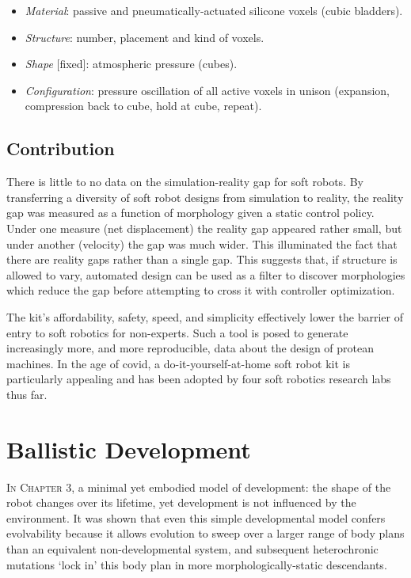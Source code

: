 \begin{itemize}
    \item \textit{Material}: passive and pneumatically-actuated silicone voxels (cubic bladders).
    \item \textit{Structure}: number, placement and kind of voxels.
    \item \textit{Shape} [fixed]: atmospheric pressure (cubes).
    \item \textit{Configuration}: pressure oscillation of all active voxels in unison (expansion, compression back to cube, hold at cube, repeat).
\end{itemize}



\subsection{Contribution}



There is little to no data on the simulation-reality gap for soft robots.
By transferring a diversity of soft robot designs from simulation to reality, the reality gap was measured as a function of morphology given a static control policy.
Under one measure (net displacement) the reality gap appeared rather small, but under another (velocity) the gap was much wider.
This illuminated the fact that there are reality gaps rather than a single gap.
This suggests that, if structure is allowed to vary, automated design can be used as a filter to discover morphologies which reduce the gap before attempting to cross it with controller optimization.

The kit's affordability, safety, speed, and simplicity effectively lower the barrier of entry to soft robotics for non-experts.
Such a tool is posed to generate increasingly more, and more reproducible, data about the design of protean machines.
In the age of covid, a do-it-yourself-at-home soft robot kit 
is particularly appealing and has been adopted by four soft robotics research labs thus far.



\section{Ballistic Development}


\textsc{In Chapter 3,}
a minimal yet embodied model of development: 
the shape of the
robot changes over its lifetime, yet development is not influenced
by the environment. 
It was shown that even this simple developmental
model confers evolvability because it allows evolution to sweep over a larger range of body plans than an equivalent non-developmental system, and subsequent heterochronic mutations
`lock in' this body plan in more morphologically-static descendants.


